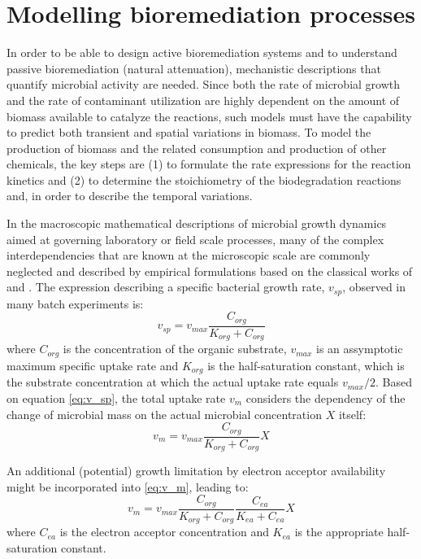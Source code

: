 \section{Modelling bioremediation processes}
In order to be able to design active bioremediation systems and to understand passive bioremediation (natural attenuation), mechanistic descriptions that quantify microbial activity are needed. Since both the rate of microbial growth and the rate of contaminant utilization are highly dependent on the amount of biomass available to catalyze the reactions, such models must have the capability to predict both transient and spatial variations in biomass. To model the production of biomass and the related consumption and production of other chemicals, the key steps are (1) to formulate the rate expressions for the reaction kinetics and (2) to determine the stoichiometry of the biodegradation reactions and, in order to describe the temporal variations.

In the macroscopic mathematical descriptions of microbial growth dynamics aimed at governing laboratory or field scale processes, many of the complex interdependencies that are known at the microscopic scale are commonly neglected and described by empirical formulations based on the classical works of \cite{michmen} and \cite{monod}. The expression describing a specific bacterial growth rate, $v_{sp}$, observed in many batch experiments is:
\begin{equation}
v_{sp} = v_{max} \frac{C_{org}}{K_{org} + C_{org}}
\label{eq:v_sp}
\end{equation}
where $C_{org}$ is the concentration of the organic substrate, $v_{max}$ is an assymptotic maximum specific uptake rate and $K_{org}$ is the half-saturation constant, which is the substrate concentration at which the actual uptake rate equals $v_{max} / 2$. Based on equation \ref{eq:v_sp}, the total uptake rate $v_m$ considers the dependency of the change of microbial mass on the actual microbial concentration $X$ itself:
\begin{equation}
v_{m} = v_{max} \frac{C_{org}}{K_{org} + C_{org}} X
\label{eq:v_m}
\end{equation}

An additional (potential) growth limitation by electron acceptor availability might be incorporated into \ref{eq:v_m}, leading to:
\begin{equation}
v_{m} = v_{max} \frac{C_{org}}{K_{org} + C_{org}} \frac{C_{ea}}{K_{ea} + C_{ea}} X
\label{eq:v_m_ea}
\end{equation}
where $C_{ea}$ is the electron acceptor concentration and $K_{ea}$ is the appropriate half-saturation constant.

